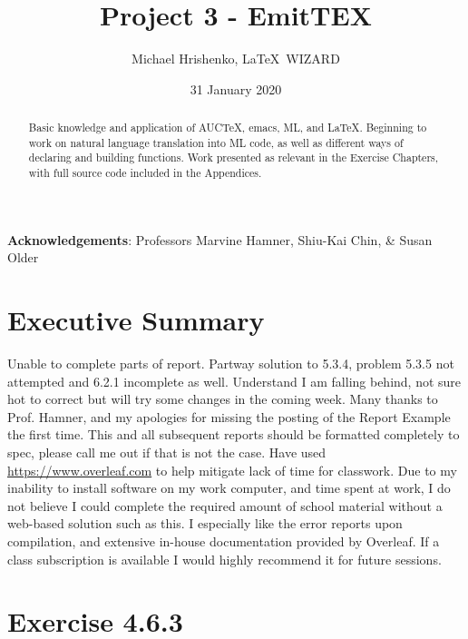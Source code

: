 \documentclass[twoside]{report}
\title{Project 3 - EmitTEX}
\date{31 January 2020}
\author{Michael Hrishenko, \LaTeX\ WIZARD}
\begin{document}
\lstset{language=ML}
\maketitle
\begin{abstract}
    Basic knowledge and application of AUCTeX, emacs, ML, and \LaTeX{}. Beginning to work on natural language translation into ML code, as well as different ways of declaring and building functions. Work presented as relevant in the Exercise Chapters, with full source code included in the Appendices.
\end{abstract}

\textbf{Acknowledgements}: Professors Marvine Hamner, Shiu-Kai Chin, \& Susan Older

\tableofcontents

\chapter{Executive Summary}
\label{cha:executive-summary}
Unable to complete parts of report. Partway solution to 5.3.4, problem 5.3.5 not attempted and 6.2.1 incomplete as well. Understand I am falling behind, not sure hot to correct but will try some changes in the coming week. Many thanks to Prof. Hamner, and my apologies for missing the posting of the Report Example the first time. This and all subsequent reports should be formatted completely to spec, please call me out if that is not the case. Have used \url{https://www.overleaf.com} to help mitigate lack of time for classwork. Due to my inability to install software on my work computer, and time spent at work, I do not believe I could complete the required amount of school material without a web-based solution such as this. I especially like the error reports upon compilation, and extensive in-house documentation provided by Overleaf. If a class subscription is available I would highly recommend it for future sessions.

\chapter{Exercise 4.6.3}
\label{cha:4-6-3}
\end{document}
